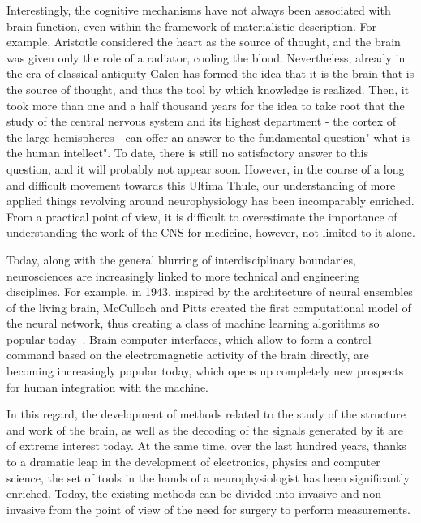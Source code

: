 Interestingly, the cognitive mechanisms have not always been associated with
brain function, even within the framework of materialistic description. For
example, Aristotle considered the heart as the source of thought, and the brain
was given only the role of a radiator, cooling the blood. Nevertheless, already
in the era of classical antiquity Galen has formed the idea that it is the
brain that is the source of thought, and thus the tool by which knowledge is
realized.  Then, it took more than one and a half thousand years for the idea
to take root that the study of the central nervous system and its highest
department - the cortex of the large hemispheres - can offer an answer to the
fundamental question" what is the human intellect". To date, there is still no
satisfactory answer to this question, and it will probably not appear soon.
However, in the course of a long and difficult movement towards this Ultima
Thule, our understanding of more applied things revolving around
neurophysiology has been incomparably enriched.   From a practical point of
view, it is difficult to overestimate the importance of understanding the work
of the CNS for medicine, however, not limited to it alone.

Today, along with the general blurring of interdisciplinary boundaries,
neurosciences are increasingly linked to more technical and engineering
disciplines.  For example, in 1943, inspired by the architecture of neural
ensembles of the living brain, McCulloch and Pitts created the first
computational model of the neural network, thus creating a class of machine
learning algorithms so popular today~\cite{McCulloch}. Brain-computer
interfaces, which allow to form a control command based on the electromagnetic
activity of the brain directly, are becoming increasingly popular today, which
opens up completely new prospects for human integration with the machine.


In this regard, the development of methods related to the study of the
structure and work of the brain, as well as the decoding of the signals
generated by it are of extreme interest today.  At the same time, over the last
hundred years, thanks to a dramatic leap in the development of electronics,
physics and computer science, the set of tools in the hands of a
neurophysiologist has been significantly enriched.  Today, the existing methods
can be divided into invasive and non-invasive from the point of view of the
need for surgery to perform measurements.

